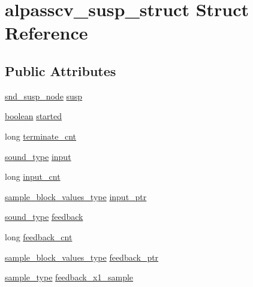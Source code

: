 \hypertarget{structalpasscv__susp__struct}{}\section{alpasscv\+\_\+susp\+\_\+struct Struct Reference}
\label{structalpasscv__susp__struct}
\subsection*{Public Attributes}
\begin{DoxyCompactItemize}
\item 
\hyperlink{sound_8h_a6b268203688a934bd798ceb55f85d4c0}{snd\+\_\+susp\+\_\+node} \hyperlink{structalpasscv__susp__struct_a4408b38b64b04a62aa0eeb198e3d239a}{susp}
\item 
\hyperlink{cext_8h_a7670a4e8a07d9ebb00411948b0bbf86d}{boolean} \hyperlink{structalpasscv__susp__struct_a018fc198a18caf68843bbd70678a6ff6}{started}
\item 
long \hyperlink{structalpasscv__susp__struct_aa6008314d5b62d2e7ca21affc10ace39}{terminate\+\_\+cnt}
\item 
\hyperlink{sound_8h_a792cec4ed9d6d636d342d9365ba265ea}{sound\+\_\+type} \hyperlink{structalpasscv__susp__struct_aad83327d5f603dc9253dd1be25851da2}{input}
\item 
long \hyperlink{structalpasscv__susp__struct_a649368ce5cc28a2ed696ba4b253edab2}{input\+\_\+cnt}
\item 
\hyperlink{sound_8h_a83d17f7b465d1591f27cd28fc5eb8a03}{sample\+\_\+block\+\_\+values\+\_\+type} \hyperlink{structalpasscv__susp__struct_a26002f981b9d848f5775d6131a5b9ae6}{input\+\_\+ptr}
\item 
\hyperlink{sound_8h_a792cec4ed9d6d636d342d9365ba265ea}{sound\+\_\+type} \hyperlink{structalpasscv__susp__struct_a33f7a0bac5dcb9a7fd193a08627f1a05}{feedback}
\item 
long \hyperlink{structalpasscv__susp__struct_ad3ecb3b495a196be2362cf2d29e4c31d}{feedback\+\_\+cnt}
\item 
\hyperlink{sound_8h_a83d17f7b465d1591f27cd28fc5eb8a03}{sample\+\_\+block\+\_\+values\+\_\+type} \hyperlink{structalpasscv__susp__struct_a56a104fbbed14c678d3f66e0504b24b4}{feedback\+\_\+ptr}
\item 
\hyperlink{sound_8h_a3a9d1d4a1c153390d2401a6e9f71b32c}{sample\+\_\+type} \hyperlink{structalpasscv__susp__struct_afaed9503b2ba5fbc1a035b5c730e896a}{feedback\+\_\+x1\+\_\+sample}
\item 

\end{DoxyCompactItemize}
